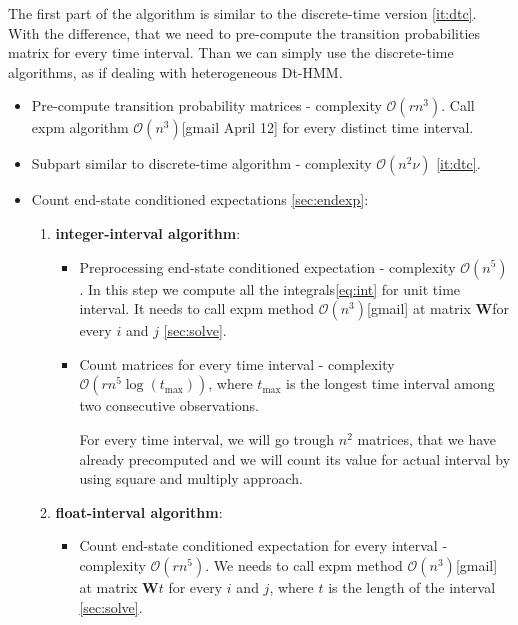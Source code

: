 \documentclass[thesis=M,english]{FITthesis}[2012/10/20]
\newcommand{\matr}[1]{\mathbf{#1}}
\begin{document}
\begin{itemize}
The first part of the algorithm is similar to the discrete-time version \ref{it:dtc}. With the difference, that we need to pre-compute the transition probabilities matrix for every time interval. Than we can simply use the discrete-time algorithms, as if dealing with heterogeneous Dt-HMM. 


\begin{itemize}\label{it:ctc}
\item Pre-compute transition probability matrices - complexity $\mathcal{O}(r n^3)$. Call expm algorithm $\mathcal{O}(n^3)$[gmail April 12] for every distinct time interval. %
\item Subpart similar to discrete-time algorithm - complexity $\mathcal{O}(n^2 \nu)$ \ref{it:dtc}.
\item 

Count end-state conditioned expectations \ref{sec:endexp}:
\begin{enumerate}[resume]
\setcounter{enumi}{0}
\item \textbf{integer-interval algorithm}:

\begin{itemize}
\item Preprocessing end-state conditioned expectation - complexity $\mathcal{O}(n^5)$. 
    In this step we compute all the integrals\eqref{eq:int} for unit time interval. It needs to call expm method $\mathcal{O}(n^3)$[gmail] at matrix $\matr{W}$for every $i$ and $j$ \ref{sec:solve}.   
\item Count matrices for every time interval - complexity $\mathcal{O}(r n^5\log(t_{\max}))$, where $t_{\max}$ is the longest time interval among two consecutive observations.

For every time interval, we will go trough $n^2$ matrices, that we have already precomputed and we will count its value for actual interval by using square and multiply approach. 


\end{itemize}

\item \textbf{float-interval algorithm}: 
\begin{itemize}
\item Count end-state conditioned expectation for every interval - complexity $\mathcal{O}(r n^5)$. 
We needs to call expm method $\mathcal{O}(n^3)$[gmail] at matrix $\matr{W}t$ for every $i$ and $j$, where $t$ is the length of the interval \ref{sec:solve}.
\end{itemize}
\end{enumerate}
 

\end{itemize}
\end{itemize}
\end{document}
